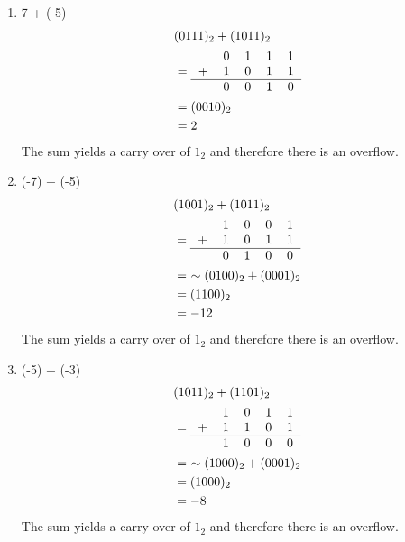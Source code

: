 \documentclass[12pt]{article}
\begin{document}
\begin{enumerate}
\begin{enumerate}
      \item 7 + (-5)
      \begin{align*}
        & (0111)_2 + (1011)_2 \\
        &= \begin{tabular}{ccccc}
          & 0 & 1 & 1 & 1 \\
        + & 1 & 0 & 1 & 1 \\
        \hline
          & 0 & 0 & 1 & 0 \\
        \end{tabular} \\
        &= (0010)_2 \\
        &= 2
      \end{align*}
      The sum yields a carry over of $1_2$ and therefore there is an overflow.

      \item (-7) + (-5)
      \begin{align*}
        & (1001)_2 + (1011)_2 \\
        &= \begin{tabular}{ccccc}
          & 1 & 0 & 0 & 1 \\
        + & 1 & 0 & 1 & 1 \\
        \hline
          & 0 & 1 & 0 & 0 \\
        \end{tabular} \\
        &= \ \sim(0100)_2 + (0001)_2 \\
        &= (1100)_2 \\
        &= -12
      \end{align*}
      The sum yields a carry over of $1_2$ and therefore there is an overflow.

      \item (-5) + (-3)
      \begin{align*}
        & (1011)_2 + (1101)_2 \\
        &= \begin{tabular}{ccccc}
          & 1 & 0 & 1 & 1 \\
        + & 1 & 1 & 0 & 1 \\
        \hline
          & 1 & 0 & 0 & 0 \\
        \end{tabular} \\
        &= \ \sim(1000)_2 + (0001)_2 \\
        &= (1000)_2 \\
        &= -8
      \end{align*}
      The sum yields a carry over of $1_2$ and therefore there is an overflow.


\end{enumerate}
\end{enumerate}
\end{document}
